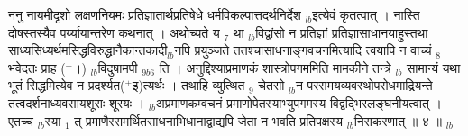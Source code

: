 \documentclass[article,12pt,a4paper]{memoir}%
\newcommand{\add}[1]{($^{+}$#1)}
\newcounter{parCount}
\begin{document}
	  
	  \pstart \leavevmode%
	ननु नायमीदृशो लक्षणनियमः प्रतिज्ञातार्थप्रतिषेधे धर्मविकल्पात्तदर्थनिर्देश {\tiny $_{lb}$}इत्येवं कृतत्वात् । नास्ति दोषस्तस्यैव पर्य्यायान्तरेण कथनात् । अथोच्यते य {\tiny $_{7}$} था {\tiny $_{lb}$}विद्वांसो न प्रतिज्ञां प्रतिज्ञासाधानयाहुस्तथा साध्यसिध्यर्थमसिद्धविरुद्धानैकान्तकादी{\tiny $_{lb}$}नपि प्रयुञ्जते ततश्चासाधनाङ्गवचनमित्यादि त्वयापि न वाच्यं {\tiny $_{8}$} भवेदतः प्राह \add{।} {\tiny $_{lb}$}विदुषामपी {\tiny $_{9b6}$} ति । अनुद्दिश्याप्रमाणकं शास्त्रोपगममिति मामकीने तन्त्रे {\tiny $_{lb}$} \leavevmode{} सामान्यं यथा भूतं सिद्धमित्येव न प्रदर्श्यत\add{इ}त्यर्थः । तथाहि व्युत्थित {\tiny $_{9}$} \leavevmode{} चेतसो {\tiny $_{lb}$}न परसमयव्यवस्थोपरोधमाद्रियन्ते तत्वदर्शनाध्यवसायशूराः शूरयः । {\tiny $_{lb}$}अप्रमाणकम्वचनं प्रमाणोपेतस्याभ्युपगमस्य विद्वद्भिरलङ्घनीयत्वात् । एतच्च {\tiny $_{lb}$}स्या {\tiny $_{1}$} त् प्रमाणैरसमर्थितसाधनाभिधानाद्वाद्यपि जेता न भवति प्रतिपक्षस्य {\tiny $_{lb}$}निराकरणात् ॥ ४ ॥
	{}
	\pend%
      {\tiny $_{lb}$}
\end{document}
